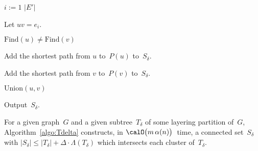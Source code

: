 \begin{algorithm}
\For
{%
    \( i := 1 \) \KwTo \( |E'| \)%
    \label{line:EprimeLoop}
}
{%
    Let $uv = e_i$.

    \If
    {%
        \( \mathrm{Find}(u) \neq \mathrm{Find}(v) \)
    }
    {%
        Add the shortest path from $u$ to~$P(u)$ to~$S_\delta$.
        \label{line:addPuToS}

        Add the shortest path from $v$ to~$P(v)$ to~$S_\delta$.
        \label{line:addPvToS}

        $\mathrm{Union}(u, v)$
        \label{line:unionSets}
    }
}

Output~$S_\delta$.
\end{algorithm}

\begin{lemma}
    \label{lem:SdeltaCardinality}
For a given graph~\( G \) and a given subtree~\( T_\delta \) of some layering partition of~\( G \), Algorithm~\ref{algo:Tdelta} constructs, in \( \calO \big( m \, \alpha(n) \big) \)~time, a connected set~\( S_\delta \) with \( |S_\delta| \leq |T_\delta| + \Delta \cdot \Lambda(T_\delta) \) which intersects each cluster of~\( T_\delta \).
\end{lemma}

